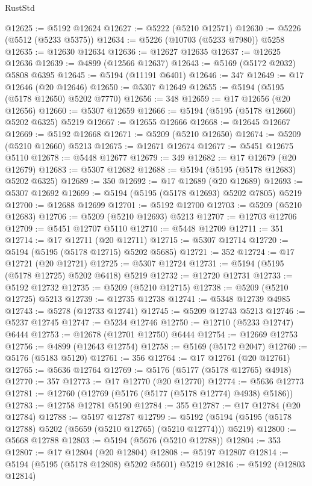 \begin{lexlean}{RustStd}
\begin{coremodule}
@12625 := @5192 @12624
@12627 := @5222 (@5210 @12571)
@12630 := @5226 (@5512 (@5233 @5375))
@12634 := @5226 (@10703 (@5233 @7980)) @5258
@12635 := @12630 @12634
@12636 := @12627 @12635
@12637 := @12625 @12636
@12639 := @4899 (@12566 @12637)
@12643 := @5169 (@5172 @2032) @5808 @6395
@12645 := @5194 (@11191 @6401)
@12646 := 347
@12649 := @17 @12646 (@20 @12646)
@12650 := @5307 @12649
@12655 := @5194 (@5195 (@5178 @12650) @5202 @7770)
@12656 := 348
@12659 := @17 @12656 (@20 @12656)
@12660 := @5307 @12659
@12666 := @5194 (@5195 (@5178 @12660) @5202 @6325) @5219
@12667 := @12655 @12666
@12668 := @12645 @12667
@12669 := @5192 @12668
@12671 := @5209 (@5210 @12650)
@12674 := @5209 (@5210 @12660) @5213
@12675 := @12671 @12674
@12677 := @5451 @12675 @5110
@12678 := @5448 @12677
@12679 := 349
@12682 := @17 @12679 (@20 @12679)
@12683 := @5307 @12682
@12688 := @5194 (@5195 (@5178 @12683) @5202 @6325)
@12689 := 350
@12692 := @17 @12689 (@20 @12689)
@12693 := @5307 @12692
@12699 := @5194 (@5195 (@5178 @12693) @5202 @7805) @5219
@12700 := @12688 @12699
@12701 := @5192 @12700
@12703 := @5209 (@5210 @12683)
@12706 := @5209 (@5210 @12693) @5213
@12707 := @12703 @12706
@12709 := @5451 @12707 @5110
@12710 := @5448 @12709
@12711 := 351
@12714 := @17 @12711 (@20 @12711)
@12715 := @5307 @12714
@12720 := @5194 (@5195 (@5178 @12715) @5202 @5685)
@12721 := 352
@12724 := @17 @12721 (@20 @12721)
@12725 := @5307 @12724
@12731 := @5194 (@5195 (@5178 @12725) @5202 @6418) @5219
@12732 := @12720 @12731
@12733 := @5192 @12732
@12735 := @5209 (@5210 @12715)
@12738 := @5209 (@5210 @12725) @5213
@12739 := @12735 @12738
@12741 := @5348 @12739 @4985
@12743 := @5278 (@12733 @12741)
@12745 := @5209 @12743 @5213
@12746 := @5237 @12745
@12747 := @5234 @12746
@12750 := @12710 (@5233 @12747) @6444
@12753 := @12678 (@12701 @12750) @6444
@12754 := @12669 @12753
@12756 := @4899 (@12643 @12754)
@12758 := @5169 (@5172 @2047)
@12760 := @5176 (@5183 @5120)
@12761 := 356
@12764 := @17 @12761 (@20 @12761)
@12765 := @5636 @12764
@12769 := @5176 (@5177 (@5178 @12765) @4918)
@12770 := 357
@12773 := @17 @12770 (@20 @12770)
@12774 := @5636 @12773
@12781 := @12760 (@12769 (@5176 (@5177 (@5178 @12774) @4938) @5186))
@12783 := @12758 @12781 @5190
@12784 := 355
@12787 := @17 @12784 (@20 @12784)
@12788 := @5197 @12787
@12799 := @5192 (@5194 (@5195 (@5178 @12788) @5202 (@5659 (@5210 @12765) (@5210 @12774))) @5219)
@12800 := @5668 @12788
@12803 := @5194 (@5676 (@5210 @12788))
@12804 := 353
@12807 := @17 @12804 (@20 @12804)
@12808 := @5197 @12807
@12814 := @5194 (@5195 (@5178 @12808) @5202 @5601) @5219
@12816 := @5192 (@12803 @12814)

\end{coremodule}
\end{lexlean}
